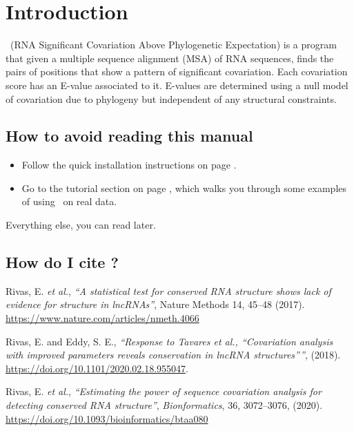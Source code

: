 \section{Introduction}
\setcounter{footnote}{0}

\rscape\ (RNA Significant Covariation Above Phylogenetic Expectation)
is a program that given a multiple sequence alignment (MSA) of RNA
sequences, finds the pairs of positions that show a pattern of
significant covariation. Each covariation score has an E-value
associated to it. E-values are determined using a null model of
covariation due to phylogeny but independent of any structural
constraints. 

\subsection{How to avoid reading this manual}

\begin{itemize}
\item Follow the quick installation instructions on page
      \pageref{section:installation}. 
\item Go to the tutorial section on page
\pageref{section:tutorial}, which walks you through some examples of
using \rscape\ on real data.
\end{itemize}

Everything else, you can read later.



\subsection{How do I cite \rscape?}

Rivas, E. \textit{et al.}, \textit{``A statistical test for conserved
  RNA structure shows lack of evidence for structure in lncRNAs''},
Nature Methods 14, 45–48 (2017).\\
\url{https://www.nature.com/articles/nmeth.4066}

\noindent
Rivas, E. and Eddy, S. E., \textit{``Response to Tavares et al.,
  “Covariation analysis with improved parameters reveals conservation
  in lncRNA structures”''}, (2018).\\
\url{https://doi.org/10.1101/2020.02.18.955047}.

\noindent
Rivas, E. \textit{et al.}, \textit{``Estimating the power of sequence
  covariation analysis for detecting conserved RNA structure''},
\textit{Bionformatics}, 36, 3072–3076, (2020).\\
\url{https://doi.org/10.1093/bioinformatics/btaa080}

